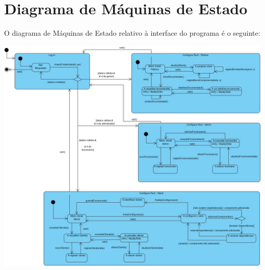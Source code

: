 \section{Diagrama de Máquinas de Estado}
O diagrama de Máquinas de Estado relativo à interface do programa é o seguinte:
	\begin{center}
		\includegraphics[width = 6in]{VPP/Maquina_de_Estado.jpg}
	\end{center}
\newpage